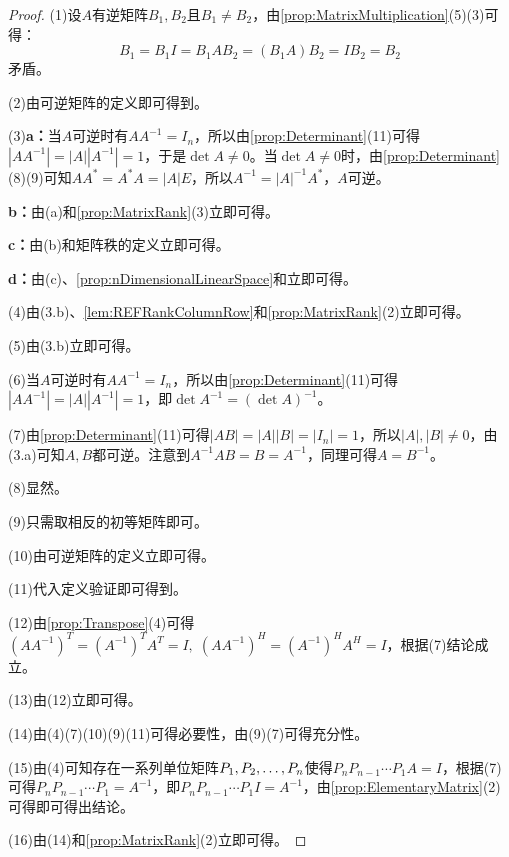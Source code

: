\begin{proof}
	(1)设$A$有逆矩阵$B_1,B_2$且$B_1\ne B_2$，由\cref{prop:MatrixMultiplication}(5)(3)可得：
	\begin{equation*}
		B_1=B_1I=B_1AB_2=(B_1A)B_2=IB_2=B_2
	\end{equation*}
	矛盾。\par
	(2)由可逆矩阵的定义即可得到。\par
	(3)\textbf{a：}当$A$可逆时有$AA^{-1}=I_n$，所以由\cref{prop:Determinant}(11)可得$|AA^{-1}|=|A||A^{-1}|=1$，于是$\det A\ne0$。当$\det A\ne0$时，由\cref{prop:Determinant}(8)(9)可知$AA^*=A^*A=|A|E$，所以$A^{-1}=|A|^{-1}A^*$，$A$可逆。\par
	\textbf{b：}由(a)和\cref{prop:MatrixRank}(3)立即可得。\par
	\textbf{c：}由(b)和矩阵秩的定义立即可得。\par
	\textbf{d：}由(c)、\cref{prop:nDimensionalLinearSpace}和立即可得。\par
	(4)由(3.b)、\cref{lem:REFRankColumnRow}和\cref{prop:MatrixRank}(2)立即可得。\par
	(5)由(3.b)立即可得。\par
	(6)当$A$可逆时有$AA^{-1}=I_n$，所以由\cref{prop:Determinant}(11)可得$|AA^{-1}|=|A||A^{-1}|=1$，即$\det A^{-1}=(\det A)^{-1}$。\par
	(7)由\cref{prop:Determinant}(11)可得$|AB|=|A||B|=|I_n|=1$，所以$|A|,|B|\ne0$，由(3.a)可知$A,B$都可逆。注意到$A^{-1}AB=B=A^{-1}$，同理可得$A=B^{-1}$。\par
	(8)显然。\par
	(9)只需取相反的初等矩阵即可。\par
	(10)由可逆矩阵的定义立即可得。\par
	(11)代入定义验证即可得到。\par
	(12)由\cref{prop:Transpose}(4)可得$(AA^{-1})^T=(A^{-1})^TA^T=I,\;(AA^{-1})^H=(A^{-1})^HA^H=I$，根据(7)结论成立。\par
	(13)由(12)立即可得。\par
	(14)由(4)(7)(10)(9)(11)可得必要性，由(9)(7)可得充分性。\par
	(15)由(4)可知存在一系列单位矩阵$P_1, P_2, \dots, P_{n}$使得$P_nP_{n-1}\cdots P_1A=I$，根据(7)可得$P_nP_{n-1}\cdots P_1=A^{-1}$，即$P_nP_{n-1}\cdots P_1I=A^{-1}$，由\cref{prop:ElementaryMatrix}(2)可得即可得出结论。\par
	(16)由(14)和\cref{prop:MatrixRank}(2)立即可得。
\end{proof}

